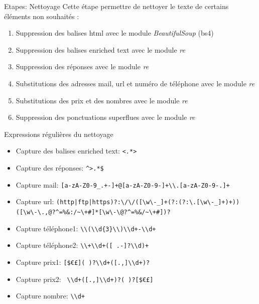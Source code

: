 \documentclass[xelatex,11pt, xcolor=dvipsnames]{beamer}
\begin{document}
\begin{frame}{Etapes: Nettoyage}
	Cette étape permettre de nettoyer le texte de certains éléments non souhaités :
	\begin{enumerate}
		\item Suppression des balises html avec le module \emph{BeautifulSoup} (bs4)
		\item Suppression des balises enriched text avec le module \emph{re}
		\item Suppression des réponses avec le module \emph{re}
		\item Substitutions des adresses mail, url et numéro de téléphone avec le module \emph{re}
		\item Substitutions des prix et des nombres avec le module \emph{re}
		\item Suppression des ponctuations superflues avec le module \emph{re}
	\end{enumerate}
\end{frame}

\begin{frame}[fragile]{Expressions régulières du nettoyage}
	\begin{itemize}
		\item Capture des balises enriched text: \verb'<.*>'
		\item Capture des réponses: \verb'^>.*$'
		\item Capture mail: \verb'[a-zA-Z0-9_.+-]+@[a-zA-Z0-9-]+\\.[a-zA-Z0-9-.]+'
		\item Capture url: \verb'(http|ftp|https)?:\/\/([\w\-_]+(?:(?:\.[\w\-_]+)+))'
							\verb'([\w\-\.,@?^=%&:/~\+#]*[\w\-\@?^=%&/~\+#])?'
		\item Capture téléphone1: \verb'\\(\\d{3}\\)\\d+-\\d+'
		\item Capture téléphone2: \verb'\\+\\d+([ .-]?\\d)+'
		\item Capture prix1: \verb'[$€£]( )?\\d+([.,]\\d+)? '
		\item Capture prix2: \verb' \\d+([.,]\\d+)?( )?[$€£]'
		\item Capture nombre: \verb'\\d+'
	\end{itemize}
\end{frame}
\end{document}
